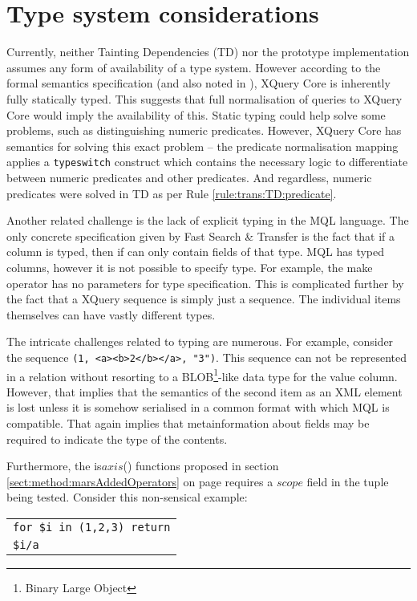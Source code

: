 \section{Type system considerations}
\label{sect:disc:typeSystem}
Currently, neither Tainting Dependencies (TD) nor the prototype
implementation assumes any form of availability of a type system. However
according to the formal semantics specification\cite{xquery_semantics} (and
also noted in \cite{pathfinder_compiling_xquery}), XQuery Core is inherently
fully statically typed. This suggests that full normalisation of queries to
XQuery Core would imply the availability of this. Static typing could help
solve some problems, such as distinguishing numeric predicates. However, XQuery
Core has semantics for solving this exact problem -- the predicate normalisation
mapping applies a \texttt{typeswitch} construct which contains the necessary logic to
differentiate between numeric predicates and other predicates. And regardless,
numeric predicates were solved in TD as per Rule \ref{rule:trans:TD:predicate}.

Another related challenge is the lack of explicit typing in the MQL language.
The only concrete specification given by Fast Search \& Transfer is the fact that if a column is
typed, then if can only contain fields of that type. MQL has typed columns,
however it is not possible to specify type. For example, the \textsf{make}
operator has no parameters for type specification. This is complicated further
by the fact that a XQuery sequence is simply just a sequence. The individual
items themselves can have vastly different types.

The intricate challenges related to typing are numerous. For example, consider
the sequence \texttt{(1, <a><b>2</b></a>, "3")}. This sequence can not be
represented in a relation without resorting to a BLOB\footnote{Binary
Large Object}-like data type for the value column. However, that implies that
the semantics of the second item as an XML element is lost unless it is somehow
serialised in a common format with which MQL is compatible. That again implies
that metainformation about fields may be required to indicate the type of the
contents.

Furthermore, the \textsf{is}$axis$\textsf{()} functions proposed in section
\ref{sect:method:marsAddedOperators} on page
\pageref{sect:method:marsAddedOperators} requires a $scope$ field in the tuple
being tested. Consider this non-sensical example:

\begin{center}
\begin{tabular}{l}
\texttt{for \$i in (1,2,3) return} \\ \quad
\texttt{\$i/a}
\end{tabular}
\end{center}


